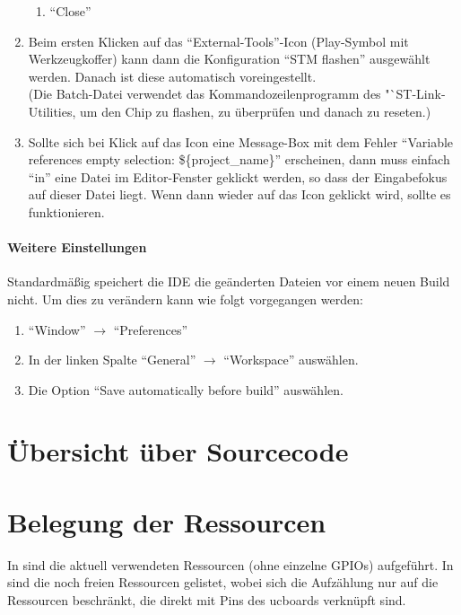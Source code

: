 \begin{enumerate}
\begin{enumerate}
			\item "`Close"'
		\end{enumerate}
	\item Beim ersten Klicken auf das "`External-Tools"'-Icon (Play-Symbol mit Werkzeugkoffer) kann dann die Konfiguration "`STM flashen"' ausgewählt werden. Danach ist diese automatisch voreingestellt.\\(Die Batch-Datei verwendet das Kommandozeilenprogramm des "`ST-Link-Utilities, um den Chip zu flashen, zu überprüfen und danach zu reseten.)
	\item Sollte sich bei Klick auf das Icon eine Message-Box mit dem Fehler "`Variable references empty selection: \$\{project\_name\}"' erscheinen, dann muss einfach "`in"' eine Datei im Editor-Fenster geklickt werden, so dass der Eingabefokus auf dieser Datei liegt. Wenn dann wieder auf das Icon geklickt wird, sollte es funktionieren.
\end{enumerate}


\paragraph{Weitere Einstellungen}

Standardmäßig speichert die IDE die geänderten Dateien vor einem neuen Build nicht. Um dies zu verändern kann wie folgt vorgegangen werden:
\begin{enumerate}
	\item "`Window"' $\to$ "`Preferences"'
	\item In der linken Spalte "`General"' $\to$ "`Workspace"' auswählen.
	\item Die Option "`Save automatically before build"' auswählen.
\end{enumerate}


\section{Übersicht über Sourcecode}


\section{Belegung der Ressourcen}

In  sind die aktuell verwendeten Ressourcen (ohne einzelne GPIOs) aufgeführt. In  sind die noch freien Ressourcen gelistet, wobei sich die Aufzählung nur auf die Ressourcen beschränkt, die direkt mit Pins des ucboards verknüpft sind.

